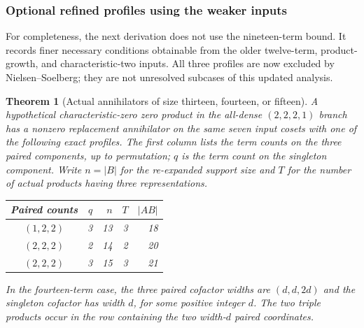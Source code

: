 \documentclass[11pt,a4paper,oneside]{report}
\newtheorem{theorem}{Theorem}[section]
\theoremstyle{definition}
\theoremstyle{remark}
\begin{document}
\subsubsection{Optional refined profiles using the weaker inputs}

For completeness, the next derivation does not use the nineteen-term
bound. It records finer necessary conditions obtainable from the
older twelve-term, product-growth, and characteristic-two inputs.
All three profiles are now excluded by Nielsen--Soelberg; they are
not unresolved subcases of this updated analysis.

\begin{theorem}[Actual annihilators of size thirteen, fourteen, or fifteen]
\label{M13:nextcolor:profiles}
A hypothetical characteristic-zero zero product in the all-dense
$(2,2,2,1)$ branch has a nonzero replacement annihilator on the same
seven input cosets with one of the following exact profiles.
The first column lists the term counts on the three paired
components, up to permutation; $q$ is the term count on the
singleton component. Write $n=|B|$ for the re-expanded support
size and $T$ for the number of actual products having three
representations.
\begin{center}
\begin{tabular}{@{}crrrr@{}}
\toprule
Paired counts & $q$ & $n$ & $T$ & $|AB|$\\
\midrule
$(1,2,2)$ &3&13&3&18\\
$(2,2,2)$ &2&14&2&20\\
$(2,2,2)$ &3&15&3&21\\
\bottomrule
\end{tabular}
\end{center}
In the fourteen-term case, the three paired cofactor widths are
$(d,d,2d)$ and the singleton cofactor has width $d$, for some
positive integer $d$. The two triple products occur in the row
containing the two width-$d$ paired coordinates.
\end{theorem}
\end{document}
